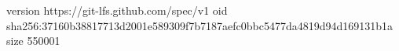 version https://git-lfs.github.com/spec/v1
oid sha256:37160b38817713d2001e589309f7b7187aefc0bbc5477da4819d94d169131b1a
size 550001
